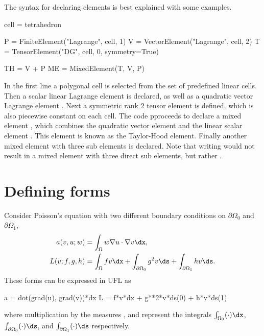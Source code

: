 The syntax for declaring elements is best explained with some
examples.
\begin{code}
cell = tetrahedron

P = FiniteElement("Lagrange", cell, 1)
V = VectorElement("Lagrange", cell, 2)
T = TensorElement("DG", cell, 0, symmetry=True)

TH = V + P
ME = MixedElement(T, V, P)
\end{code}
In the first line a polygonal cell is selected from the set of
predefined linear cells.  Then a scalar linear Lagrange element
 is declared, as well as a quadratic vector Lagrange element
.  Next a symmetric rank 2 tensor element  is
defined, which is also piecewise constant on each cell.  The code
pproceeds to declare a mixed element , which combines the
quadratic vector element  and the linear scalar element
. This element is known as the Taylor-Hood element.  Finally
another mixed element with three sub elements is declared. Note that
writing  would not result in a mixed element with
three direct sub elements, but rather
.

\section{Defining forms}
\label{ufl:sec:forms}

Consider Poisson's equation with two different boundary
conditions on $\partial\Omega_0$ and $\partial\Omega_1$,
\begin{align}
a(v, u; w) &= \int_\Omega w \nabla u \cdot \nabla v \dx, \\
L(v; f, g, h) &= \int_\Omega f v \dx + \int_{\partial\Omega_0} g^2 v \ds + \int_{\partial\Omega_1} h v \ds.
\end{align}
These forms can be expressed in UFL as
\begin{code}
a = dot(grad(u), grad(v))*dx
L = f*v*dx + g**2*v*ds(0) + h*v*ds(1)
\end{code}
where multiplication by the measures ,  and 
represent the integrals $\int_{\Omega_0} (\cdot) \dx$,
$\int_{\partial\Omega_0} (\cdot) \ds$,
and $\int_{\partial\Omega_1} (\cdot) \ds$
respectively.

